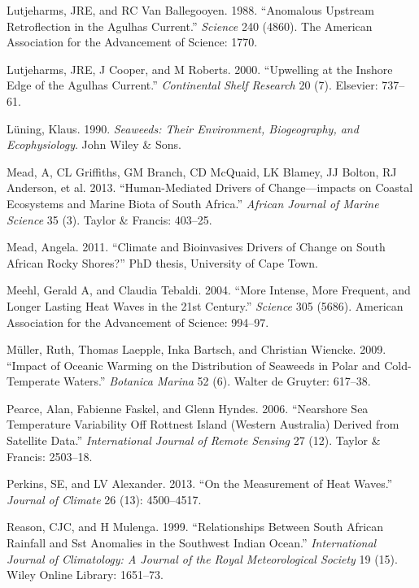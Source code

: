 \documentclass[12pt,A4paper,]{article}
\begin{document}
\hypertarget{ref-Lutjeharms1988}{}
Lutjeharms, JRE, and RC Van Ballegooyen. 1988. ``Anomalous Upstream
Retroflection in the Agulhas Current.'' \emph{Science} 240 (4860). The
American Association for the Advancement of Science: 1770.

\hypertarget{ref-Lutjeharms2000}{}
Lutjeharms, JRE, J Cooper, and M Roberts. 2000. ``Upwelling at the
Inshore Edge of the Agulhas Current.'' \emph{Continental Shelf Research}
20 (7). Elsevier: 737--61.

\hypertarget{ref-Luning1990}{}
Lüning, Klaus. 1990. \emph{Seaweeds: Their Environment, Biogeography,
and Ecophysiology}. John Wiley \& Sons.

\hypertarget{ref-Mead2013}{}
Mead, A, CL Griffiths, GM Branch, CD McQuaid, LK Blamey, JJ Bolton, RJ
Anderson, et al. 2013. ``Human-Mediated Drivers of Change---impacts on
Coastal Ecosystems and Marine Biota of South Africa.'' \emph{African
Journal of Marine Science} 35 (3). Taylor \& Francis: 403--25.

\hypertarget{ref-Mead2011}{}
Mead, Angela. 2011. ``Climate and Bioinvasives Drivers of Change on
South African Rocky Shores?'' PhD thesis, University of Cape Town.

\hypertarget{ref-Meehl2004}{}
Meehl, Gerald A, and Claudia Tebaldi. 2004. ``More Intense, More
Frequent, and Longer Lasting Heat Waves in the 21st Century.''
\emph{Science} 305 (5686). American Association for the Advancement of
Science: 994--97.

\hypertarget{ref-Muller2009}{}
Müller, Ruth, Thomas Laepple, Inka Bartsch, and Christian Wiencke. 2009.
``Impact of Oceanic Warming on the Distribution of Seaweeds in Polar and
Cold-Temperate Waters.'' \emph{Botanica Marina} 52 (6). Walter de
Gruyter: 617--38.

\hypertarget{ref-Pearce2006}{}
Pearce, Alan, Fabienne Faskel, and Glenn Hyndes. 2006. ``Nearshore Sea
Temperature Variability Off Rottnest Island (Western Australia) Derived
from Satellite Data.'' \emph{International Journal of Remote Sensing} 27
(12). Taylor \& Francis: 2503--18.

\hypertarget{ref-Perkins2013}{}
Perkins, SE, and LV Alexander. 2013. ``On the Measurement of Heat
Waves.'' \emph{Journal of Climate} 26 (13): 4500--4517.

\hypertarget{ref-Reason1999}{}
Reason, CJC, and H Mulenga. 1999. ``Relationships Between South African
Rainfall and Sst Anomalies in the Southwest Indian Ocean.''
\emph{International Journal of Climatology: A Journal of the Royal
Meteorological Society} 19 (15). Wiley Online Library: 1651--73.
\end{document}
